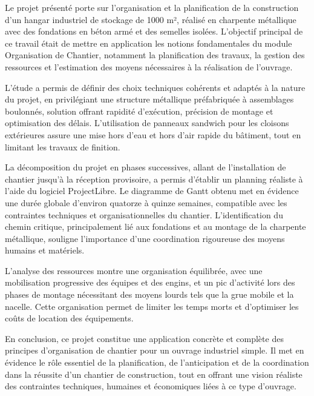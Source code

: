 \documentclass[12pt,a4paper]{report}
\begin{document}
	Le projet présenté porte sur l’organisation et la planification de la construction d’un hangar industriel de stockage de 1000 m², réalisé en charpente métallique avec des fondations en béton armé et des semelles isolées. L’objectif principal de ce travail était de mettre en application les notions fondamentales du module Organisation de Chantier, notamment la planification des travaux, la gestion des ressources et l’estimation des moyens nécessaires à la réalisation de l’ouvrage.
	
	\vspace{\baselineskip}
	
	L’étude a permis de définir des choix techniques cohérents et adaptés à la nature du projet, en privilégiant une structure métallique préfabriquée à assemblages boulonnés, solution offrant rapidité d’exécution, précision de montage et optimisation des délais. L’utilisation de panneaux sandwich pour les cloisons extérieures assure une mise hors d’eau et hors d’air rapide du bâtiment, tout en limitant les travaux de finition.
	
	\vspace{\baselineskip}
	
	La décomposition du projet en phases successives, allant de l’installation de chantier jusqu’à la réception provisoire, a permis d’établir un planning réaliste à l’aide du logiciel ProjectLibre. Le diagramme de Gantt obtenu met en évidence une durée globale d’environ quatorze à quinze semaines, compatible avec les contraintes techniques et organisationnelles du chantier. L’identification du chemin critique, principalement lié aux fondations et au montage de la charpente métallique, souligne l’importance d’une coordination rigoureuse des moyens humains et matériels.
	
	\vspace{\baselineskip}
	
	L’analyse des ressources montre une organisation équilibrée, avec une mobilisation progressive des équipes et des engins, et un pic d’activité lors des phases de montage nécessitant des moyens lourds tels que la grue mobile et la nacelle. Cette organisation permet de limiter les temps morts et d’optimiser les coûts de location des équipements.
	
	\vspace{\baselineskip}
	
	En conclusion, ce projet constitue une application concrète et complète des principes d’organisation de chantier pour un ouvrage industriel simple. Il met en évidence le rôle essentiel de la planification, de l’anticipation et de la coordination dans la réussite d’un chantier de construction, tout en offrant une vision réaliste des contraintes techniques, humaines et économiques liées à ce type d’ouvrage.
	
	
\end{document}
